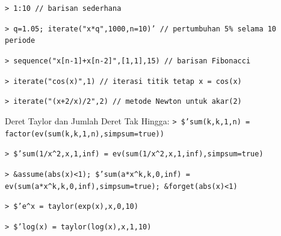\documentclass[11pt, a4paper]{article}
\newcommand{\emtcmd}[1]{\noindent\texttt{\textcolor{emtcommand}{>}\ #1}\par\smallskip}
\begin{document}
\emtcmd{1:10 \textcolor{emtcomment}{// barisan sederhana}}
\emtcmd{q=1.05; iterate("x*q",1000,n=10)' \textcolor{emtcomment}{// pertumbuhan 5\% selama 10 periode}}
\emtcmd{sequence("x[n-1]+x[n-2]",[1,1],15) \textcolor{emtcomment}{// barisan Fibonacci}}
\emtcmd{iterate("cos(x)",1) \textcolor{emtcomment}{// iterasi titik tetap x = cos(x)}}
\emtcmd{iterate("(x+2/x)/2",2) \textcolor{emtcomment}{// metode Newton untuk akar(2)}}

Deret Taylor dan Jumlah Deret Tak Hingga:
\emtcmd{\$'sum(k,k,1,n) = factor(ev(sum(k,k,1,n),simpsum=true))}
\emtcmd{\$'sum(1/x\^{}2,x,1,inf) = ev(sum(1/x\^{}2,x,1,inf),simpsum=true)}
\emtcmd{\&assume(abs(x)<1); \$'sum(a*x\^{}k,k,0,inf) = ev(sum(a*x\^{}k,k,0,inf),simpsum=true); \&forget(abs(x)<1)}
\emtcmd{\$'e\^{}x = taylor(exp(x),x,0,10)}
\emtcmd{\$'log(x) = taylor(log(x),x,1,10)}
\end{document}
